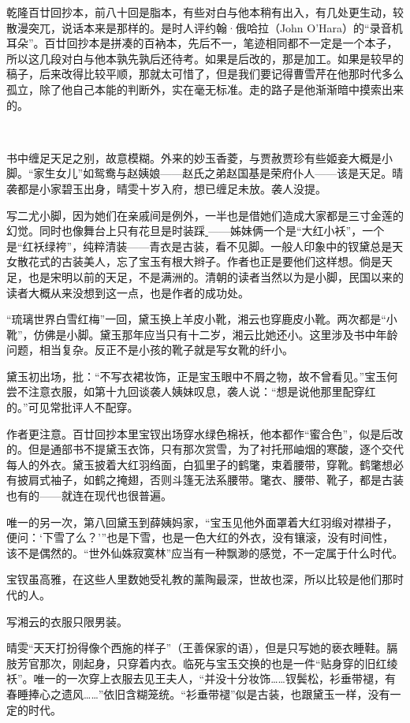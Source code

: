 \par 乾隆百廿回抄本，前八十回是脂本，有些对白与他本稍有出入，有几处更生动，较散漫突兀，说话本来是那样的。是时人评约翰·俄哈拉（John O'Hara）的“录音机耳朵”。百廿回抄本是拼凑的百衲本，先后不一，笔迹相同都不一定是一个本子，所以这几段对白与他本孰先孰后还待考。如果是后改的，那是加工。如果是较早的稿子，后来改得比较平顺，那就太可惜了，但是我们要记得曹雪芹在他那时代多么孤立，除了他自己本能的判断外，实在毫无标准。走的路子是他渐渐暗中摸索出来的。
\par  
\par 书中缠足天足之别，故意模糊。外来的妙玉香菱，与贾赦贾珍有些姬妾大概是小脚。“家生女儿”如鸳鸯与赵姨娘——赵氏之弟赵国基是荣府仆人——该是天足。晴袭都是小家碧玉出身，晴雯十岁入府，想已缠足未放。袭人没提。
\par 写二尤小脚，因为她们在亲戚间是例外，一半也是借她们造成大家都是三寸金莲的幻觉。同时也像舞台上只有花旦是时装踩\underline{𫏋}——姊妹俩一个是“大红小袄”，一个是“红袄绿袴”，纯粹清装——青衣是古装，看不见脚。一般人印象中的钗黛总是天女散花式的古装美人，忘了宝玉有根大辫子。作者也正是要他们这样想。倘是天足，也是宋明以前的天足，不是满洲的。清朝的读者当然以为是小脚，民国以来的读者大概从来没想到这一点，也是作者的成功处。
\par “琉璃世界白雪红梅”一回，黛玉换上羊皮小靴，湘云也穿鹿皮小靴。两次都是“小靴”，仿佛是小脚。黛玉那年应当只有十二岁，湘云比她还小。这里涉及书中年龄问题，相当复杂。反正不是小孩的靴子就是写女靴的纤小。
\par 黛玉初出场，批：“不写衣裙妆饰，正是宝玉眼中不屑之物，故不曾看见。”宝玉何尝不注意衣服，如第十九回谈袭人姨妹叹息，袭人说：“想是说他那里配穿红的。”可见常批评人不配穿。
\par 作者更注意。百廿回抄本里宝钗出场穿水绿色棉袄，他本都作“蜜合色”，似是后改的。但是通部书不提黛玉衣饰，只有那次赏雪，为了衬托邢岫烟的寒酸，逐个交代每人的外衣。黛玉披着大红羽绉面，白狐里子的鹤氅，束着腰带，穿靴。鹤氅想必有披肩式袖子，如鹤之掩翅，否则斗篷无法系腰带。氅衣、腰带、靴子，都是古装也有的——就连在现代也很普遍。
\par 唯一的另一次，第八回黛玉到薛姨妈家，“宝玉见他外面罩着大红羽缎对襟褂子，便问：‘下雪了么？'”也是下雪，也是一色大红的外衣，没有镶滚，没有时间性，该不是偶然的。“世外仙姝寂寞林”应当有一种飘渺的感觉，不一定属于什么时代。
\par 宝钗虽高雅，在这些人里数她受礼教的薰陶最深，世故也深，所以比较是他们那时代的人。
\par 写湘云的衣服只限男装。
\par 晴雯“天天打扮得像个西施的样子”（王善保家的语），但是只写她的亵衣睡鞋。膈肢芳官那次，刚起身，只穿着内衣。临死与宝玉交换的也是一件“贴身穿的旧红绫袄”。唯一的一次穿上衣服去见王夫人，“并没十分妆饰……钗\ShenBei 鬓松，衫垂带褪，有春睡捧心之遗风……”依旧含糊笼统。“衫垂带褪”似是古装，也跟黛玉一样，没有一定的时代。
